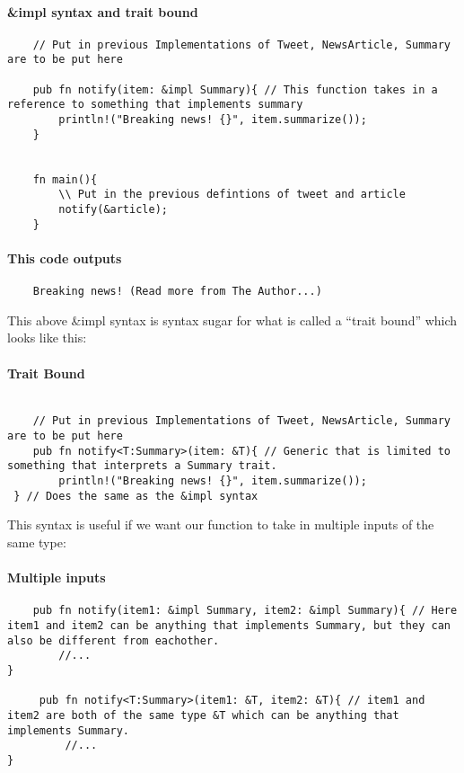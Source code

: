 \paragraph*{\&impl syntax and trait bound}\begin{lstlisting}
    // Put in previous Implementations of Tweet, NewsArticle, Summary are to be put here

    pub fn notify(item: &impl Summary){ // This function takes in a reference to something that implements summary
        println!("Breaking news! {}", item.summarize());
    }
   

    fn main(){
        \\ Put in the previous defintions of tweet and article
        notify(&article);
    }
\end{lstlisting}
\paragraph*{This code outputs}\begin{lstlisting}
    Breaking news! (Read more from The Author...)
\end{lstlisting}
This above \&impl syntax is syntax sugar for what is called a ``trait bound'' which looks like this:

\paragraph*{Trait Bound}\begin{lstlisting}
    
    // Put in previous Implementations of Tweet, NewsArticle, Summary are to be put here
    pub fn notify<T:Summary>(item: &T){ // Generic that is limited to something that interprets a Summary trait.
        println!("Breaking news! {}", item.summarize());
 } // Does the same as the &impl syntax 
\end{lstlisting}

This syntax is useful if we want our function to take in multiple inputs of the same type:
\paragraph*{Multiple inputs}\begin{lstlisting}
    pub fn notify(item1: &impl Summary, item2: &impl Summary){ // Here item1 and item2 can be anything that implements Summary, but they can also be different from eachother.
        //...
}

     pub fn notify<T:Summary>(item1: &T, item2: &T){ // item1 and item2 are both of the same type &T which can be anything that implements Summary. 
         //...
}
\end{lstlisting}


